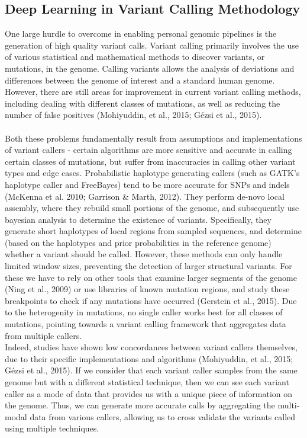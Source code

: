 \documentclass{article}
\begin{document}
\subsection{Deep Learning in Variant Calling Methodology}
One large hurdle to overcome in enabling personal genomic pipelines is the generation of high quality variant calls. Variant calling primarily involves the use of various statistical and mathematical methods to discover variants, or mutations, in the genome. Calling variants allows the analysis of deviations and differences between the genome of interest and a standard human genome. However, there are still areas for improvement in current variant calling methods, including dealing with different classes of mutations, as well as reducing the number of false positives (Mohiyuddin, et al., 2015; Gézsi et al., 2015). \\\\Both these problems fundamentally result from assumptions and implementations of variant callers - certain algorithms are more sensitive and accurate in calling certain classes of mutations, but suffer from inaccuracies in calling other variant types and edge cases. Probabilistic haplotype generating callers (such as GATK's haplotype caller and FreeBayes) tend to be more accurate for SNPs and indels (McKenna et al. 2010; Garrison \& Marth, 2012). They perform de-novo local assembly, where they rebuild small portions of the genome, and subsequently use bayesian analysis to determine the existence of variants. Specifically, they generate short haplotypes of local regions from sampled sequences, and determine (based on the haplotypes and prior probabilities in the reference genome) whether a variant should be called. However, these methods can only handle limited window sizes, preventing the detection of larger structural variants. For these we have to rely on other tools that examine larger segments of the genome (Ning et al., 2009) or use libraries of known mutation regions, and study these breakpoints to check if any mutations have occurred (Gerstein et al., 2015). Due to the heterogenity in mutations, no single caller works best for all classes of mutations, pointing towards a variant calling framework that aggregates data from multiple callers.\\

Indeed, studies have shown low concordances between variant callers themselves, due to their specific implementations and algorithms (Mohiyuddin, et al., 2015; Gézsi et al., 2015). If we consider that each variant caller samples from the same genome but with a different statistical technique, then we can see each variant caller as a mode of data that provides us with a unique piece of information on the genome. Thus, we can generate more accurate calls by aggregating the multi-modal data from various callers, allowing us to cross validate the variants called using multiple techniques.\\
\end{document}
